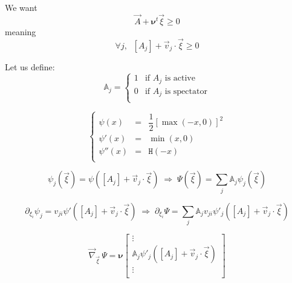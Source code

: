 \documentclass[aps,onecolumn,11pt]{revtex4}
\begin{document}
We want
\begin{equation}
	\vec{A} + \bm{\nu}^t \vec{\xi} \geq 0
\end{equation}
meaning
\begin{equation}
	\forall j, \;\; [A_j] + \vec{v}_j \cdot \vec{\xi} \geq 0
\end{equation}

Let us define:
\begin{equation}
	\mathbb{A}_j = \left\lbrace
	\begin{array}{cl}
	1 & \text{if $A_j$ is active}\\
	0 & \text{if $A_j$ is spectator}\\
	\end{array}
	\right.
\end{equation}

\begin{equation}
\left\lbrace
\begin{array}{rcl}
	\psi(x)   & = & \dfrac{1}{2} \left[ \max\left( -x, 0 \right) \right]^2\\
	\psi'(x)  & = & \min(x,0) \\
	\psi''(x) & = & \mathtt{H}(-x)\\
\end{array}
\right.
\end{equation} 

\begin{equation}
	\psi_j(\vec{\xi}) = \psi( [A_j] + \vec{v}_j \cdot \vec{\xi})
 \; \Rightarrow \;
	\Psi(\vec{\xi}) = \sum_j \mathbb{A}_j \psi_j(\vec{\xi})
\end{equation}


\begin{equation}
	\partial_{\xi_i}\psi_j = v_{ji}\psi'( [A_j] + \vec{v}_j \cdot \vec{\xi} )  
 \; \Rightarrow \;
	\partial_{\xi_i}\Psi = \sum_j \mathbb{A}_j  v_{ji}\psi'_j\left( [A_j] + \vec{v}_j \cdot \vec{\xi} \right)  
\end{equation}

\begin{equation}
	\vec{\nabla}_{\vec{\xi}}\, \Psi = \bm{\nu} 
	\begin{bmatrix}
	\vdots\\
	\mathbb{A}_j \psi'_j( [A_j] + \vec{v}_j \cdot \vec{\xi} )\\
	\vdots\\
	\end{bmatrix}
\end{equation}
\end{document}
